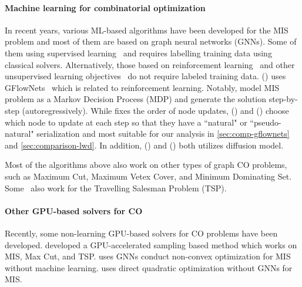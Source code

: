 \paragraph{Machine learning for combinatorial optimization}
In recent years, various ML-based algorithms have been developed for the MIS problem and most of them are based on graph neural networks (GNNs). Some of them using supervised learning~\citep{li2018combinatorial, sun2023difusco, li2024distribution} and requires labelling training data using classical solvers. Alternatively, those based on reinforcement learning~\citep{khalil2017learning, ahn2020learning, qiu2022dimes, sanokowski2023variational} and other unsupervised learning objectives~\citep{karalias2020erdos,sun2022annealed, zhang2023let, sanokowskidiffusion} do not require labeled training data. \citet{zhang2023let} (\gflownets) uses GFlowNets~\citep{bengio2021flow} which is related to reinforcement learning.
Notably, \citet{ahn2020learning, sanokowski2023variational, zhang2023let} model MIS problem as a Markov Decision Process (MDP) and generate the solution step-by-step (autoregressively). While \citet{sanokowski2023variational} fixes the order of node updates, \citet{ahn2020learning} (\lwd) and \citet{zhang2023let} (\gflownets) choose which node to update at each step so that they have a ``natural" or ``pseudo-natural" serialization and most suitable for our analysis in \cref{sec:comp-gflownets} and \cref{sec:comparison-lwd}. 
In addition, \citet{sun2023difusco} (\difusco) and \citet{sanokowskidiffusion} (\diffuco) both utilizes diffusion model. 

Most of the algorithms above also work on other types of graph CO problems, such as Maximum Cut, Maximum Vetex Cover, and Minimum Dominating Set. Some~\citep{khalil2017learning, qiu2022dimes, sun2023difusco} also work for the Travelling Salesman Problem (TSP).

\paragraph{Other GPU-based solvers for CO}
Recently, some non-learning GPU-based solvers for CO problems have been developed. \citet{sun2023revisiting} developed a GPU-accelerated sampling based method which works on MIS, Max Cut, and TSP. \citet{schuetz2022combinatorial, ichikawa2023controlling} uses GNNs conduct non-convex optimization for MIS without machine learning. \citet{alkhouri2024dataless} uses direct quadratic optimization without GNNs for MIS.


